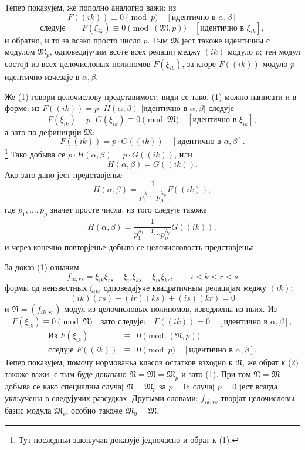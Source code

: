 ﻿\documentclass[11pt]{article}
\providecommand{\frM}{\mathfrak M}
\providecommand{\frN}{\mathfrak N}
\begin{document}
Тепер показујем, же пополно аналогно важи: из
\[
        F((ik))\equiv0\pmod p\quad [\text{идентично в \(\alpha,\beta\)}]
\]
\begin{equation}
        \text{следује}\qquad
        F(\xi_{ik})\equiv0\pmod{(\frM,p)}\quad [\text{идентично в \(\xi_{ik}\)}],
\end{equation}
и обратно, и то за всако просто число \(p\). Тым \(\frM\) јест такоже идентичны с модулом \(\frM_p\), одповедајучим всоте всех релациј меджу \((ik)\) модуло \(p\); тен модул состојí из всех целочисловых полиномов \(F(\xi_{ik})\), за кторе \(F((ik))\) модуло \(p\) идентично изчезаје в \(\alpha,\beta\).

Же (1) говори целочислову представимост, види се тако. (1) можно написати и в форме: из \(F((ik))=p\cdot H(\alpha,\beta)\) [идентично в \(\alpha,\beta\)] следује
\[
        F(\xi_{ik})-p\cdot G(\xi_{ik})\equiv0\pmod{\frM}
        \quad [\text{идентично в \(\xi_{ik}\)}],
\]
а зато по дефиницији \(\frM\):
\[
        F((ik))=p\cdot G((ik))\quad [\text{идентично в \(\alpha,\beta\)}].
\]
\footnote{Тут последньи закльучак доказује једночасно и обрат к (1).}
Тако добыва се \(p\cdot H(\alpha,\beta)=p\cdot G((ik))\), или
\[
        H(\alpha,\beta)=G((ik)).
\]
Ако зато дано јест представјенье
\[
        H(\alpha,\beta)
        =
        \frac1{p_1^{\lambda_1}\cdots p_\rho^{\lambda_\rho}}
        F((ik)),
\]
где \(p_1,\ldots,p_\rho\) значет просте числа, из того следује такоже
\[
        H(\alpha,\beta)
        =
        \frac1{p_1^{\lambda_1-1}\cdots p_\rho^{\lambda_\rho}}
        G((ik)),
\]
и через конечно повторјенье добыва се целочисловость представјеньа.

За доказ (1) означим
\[
        f_{ik,rs}=\xi_{ik}\xi_{rs}-\xi_{ir}\xi_{ks}+\xi_{is}\xi_{kr},
        \qquad i<k<r<s
\]
формы од неизвестных \(\xi_{ik}\), одповедајуче квадратичным релацијам меджу \((ik)\):
\[
        (ik)(rs)-(ir)(ks)+(is)(kr)=0
\]
и \(\frN=(f_{ik,rs})\) модул из целочисловых полиномов, изводжены из ньих. Из
\[
        F(\xi_{ik})\equiv0\pmod{\frN}
        \quad\text{зато следује:}\quad
        F((ik))=0\quad [\text{идентично в \(\alpha,\beta\)}],
\]
\begin{equation}
\begin{array}{rcl}
        \text{Из }F(\xi_{ik})&\equiv&0\pmod{(\frN,p)}\\
        \text{следује }F((ik))&\equiv&0\pmod p\quad[\text{идентично в \(\alpha,\beta\)}].
\end{array}
\end{equation}
Тепер показујем, помочу нормованьа класов остатков взходно к \(\frN\), же обрат к (2) такоже важи; с тым буде доказано \(\frN=\frM=\frM_p\) и зато (1). При том \(\frN=\frM\) добыва се како специалны случај \(\frN=\frM_p\) за \(p=0\); случај \(p=0\) јест всагда укльучены в следујучих разсудках. Другыми словами: \(f_{ik,rs}\) творјат целочисловы базис модула \(\frM_p\), особно такоже \(\frM_0=\frM\).
\end{document}
